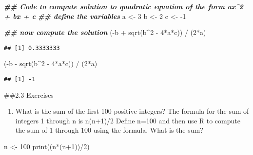 \documentclass[
]{article}
\newenvironment{Shaded}{\begin{snugshade}}{\end{snugshade}}
\newcommand{\DecValTok}[1]{\textcolor[rgb]{0.00,0.00,0.81}{#1}}
\newcommand{\DocumentationTok}[1]{\textcolor[rgb]{0.56,0.35,0.01}{\textbf{\textit{#1}}}}
\newcommand{\FunctionTok}[1]{\textcolor[rgb]{0.00,0.00,0.00}{#1}}
\newcommand{\NormalTok}[1]{#1}
\newcommand{\OtherTok}[1]{\textcolor[rgb]{0.56,0.35,0.01}{#1}}
\newcommand{\SpecialCharTok}[1]{\textcolor[rgb]{0.00,0.00,0.00}{#1}}
\providecommand{\tightlist}{%
  \setlength{\itemsep}{0pt}\setlength{\parskip}{0pt}}
\begin{document}
\begin{Shaded}
\begin{Highlighting}[]
\DocumentationTok{\#\# Code to compute solution to quadratic equation of the form ax\^{}2 + bx + c}
\DocumentationTok{\#\# define the variables}
\NormalTok{a }\OtherTok{\textless{}{-}} \DecValTok{3} 
\NormalTok{b }\OtherTok{\textless{}{-}} \DecValTok{2}
\NormalTok{c }\OtherTok{\textless{}{-}} \SpecialCharTok{{-}}\DecValTok{1}

\DocumentationTok{\#\# now compute the solution}
\NormalTok{(}\SpecialCharTok{{-}}\NormalTok{b }\SpecialCharTok{+} \FunctionTok{sqrt}\NormalTok{(b}\SpecialCharTok{\^{}}\DecValTok{2} \SpecialCharTok{{-}} \DecValTok{4}\SpecialCharTok{*}\NormalTok{a}\SpecialCharTok{*}\NormalTok{c)) }\SpecialCharTok{/}\NormalTok{ (}\DecValTok{2}\SpecialCharTok{*}\NormalTok{a)}
\end{Highlighting}
\end{Shaded}

\begin{verbatim}
## [1] 0.3333333
\end{verbatim}

\begin{Shaded}
\begin{Highlighting}[]
\NormalTok{(}\SpecialCharTok{{-}}\NormalTok{b }\SpecialCharTok{{-}} \FunctionTok{sqrt}\NormalTok{(b}\SpecialCharTok{\^{}}\DecValTok{2} \SpecialCharTok{{-}} \DecValTok{4}\SpecialCharTok{*}\NormalTok{a}\SpecialCharTok{*}\NormalTok{c)) }\SpecialCharTok{/}\NormalTok{ (}\DecValTok{2}\SpecialCharTok{*}\NormalTok{a)}
\end{Highlighting}
\end{Shaded}

\begin{verbatim}
## [1] -1
\end{verbatim}

\#\#2.3 Exercises

\begin{enumerate}
\def\labelenumi{\arabic{enumi}.}
\tightlist
\item
  What is the sum of the first 100 positive integers? The formula for
  the sum of integers 1 through n is n(n+1)/2 Define n=100 and then use
  R to compute the sum of 1 through 100 using the formula. What is the
  sum?
\end{enumerate}

\begin{Shaded}
\begin{Highlighting}[]
\NormalTok{n }\OtherTok{\textless{}{-}} \DecValTok{100}
\FunctionTok{print}\NormalTok{((n}\SpecialCharTok{*}\NormalTok{(n}\SpecialCharTok{+}\DecValTok{1}\NormalTok{))}\SpecialCharTok{/}\DecValTok{2}\NormalTok{)}
\end{Highlighting}
\end{Shaded}
\end{document}
